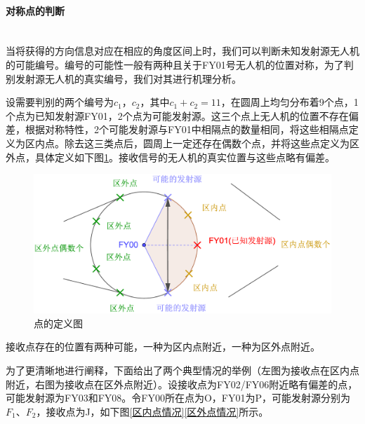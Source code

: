\documentclass{ctexart}
\newcommand{\subsubsubsection}[1]{\paragraph{#1}\mbox{}\\}
\begin{document}
\subsubsubsection{对称点的判断}

当将获得的方向信息对应在相应的角度区间上时，我们可以判断未知发射源无人机的可能编号。编号的可能性一般有两种且关于FY01号无人机的位置对称，为了判别发射源无人机的真实编号，我们对其进行机理分析。

设需要判别的两个编号为$c_1$，$c_2$，其中$c_1+c_2=11$，在圆周上均匀分布着9个点，1个点为已知发射源FY01，2个点为可能发射源。这三个点上无人机的位置不存在偏差，根据对称特性，2个可能发射源与FY01中相隔点的数量相同，将这些相隔点定义为区内点。除去这三类点后，圆周上一定还存在偶数个点，并将这些点定义为区外点，具体定义如下图\ref{点的定义图}。接收信号的无人机的真实位置与这些点略有偏差。

\begin{figure}[htbp]
  \centering
  \includegraphics[width=0.75\linewidth]{pic/regional_points.eps}
  \caption{点的定义图}
  \label{点的定义图}
  \end{figure}


接收点存在的位置有两种可能，一种为区内点附近，一种为区外点附近。

为了更清晰地进行阐释，下面给出了两个典型情况的举例（左图为接收点在区内点附近，右图为接收点在区外点附近）。设接收点为FY02/FY06附近略有偏差的点，可能发射源为FY03和FY08。令FY00所在点为O，FY01为P，可能发射源分别为$F_1$、$F_2$，接收点为J，如下图\ref{区内点情况}\ref{区外点情况}所示。
\end{document}
